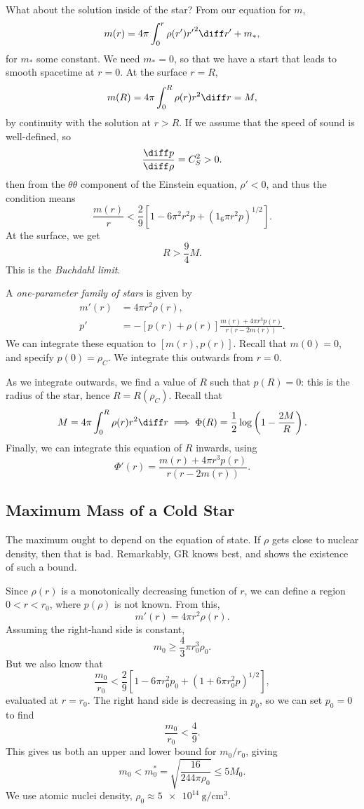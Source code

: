 \documentclass[12pt]{article}
\begin{document}
What about the solution inside of the star? From our equation for $m$,
\[
m(r) = 4 \pi \int_0^r \rho(r') {r'}^2 \diff r' + m_\ast,
\]
for $m_\ast$ some constant. We need $m_\ast = 0$, so that we have a start that leads to smooth spacetime at $r = 0$. At the surface $r = R$,
\[
m(R) = 4 \pi \int_0^R \rho(r) r^2 \diff r = M,
\]
by continuity with the solution at $r > R$. If we assume that the speed of sound is well-defined, so
\[
\frac{\diff p}{\diff \rho} = C_S^2 > 0.
\]
then from the $\theta\theta$ component of the Einstein equation, $\rho' < 0$, and thus the condition means
\[
	\frac{m(r)}{r} < \frac{2}{9} \left[ 1 - 6 \pi^2 r^2 p + (1 _ 6 \pi r^2 p)^{1/2} \right].
\]
At the surface, we get
\[
R > \frac 94 M.
\]
This is the \emph{Buchdahl limit}.

A \emph{one-parameter family of stars} is given by
\begin{align*}
	m'(r) &= 4 \pi r^2 \rho(r), \\
	p' &= - [p(r) + \rho(r)] \frac{m(r) + 4 \pi r^3 p(r)}{r(r - 2m(r))}.
\end{align*}
We can integrate these equation to $[m(r), p(r)]$. Recall that $m(0) = 0$, and specify $p(0) = \rho_C$. We integrate this outwards from $r = 0$.

As we integrate outwards, we find a value of $R$ such that $p(R) = 0$: this is the radius of the star, hence $R = R(\rho_C)$. Recall that
\[
M = 4 \pi \int_0^R \rho(r) r^2 \diff r \implies \Phi(R) = \frac 12 \log \left( 1 - \frac{2M}{R} \right).
\]
Finally, we can integrate this equation of $R$ inwards, using
\[
\Phi'(r) = \frac{m(r) + 4 \pi r^3 p(r)}{r(r - 2m(r))}.
\]

\subsection{Maximum Mass of a Cold Star}%
\label{sub:mmcs}

The maximum ought to depend on the equation of state. If $\rho$ gets close to nuclear density, then that is bad. Remarkably, GR knows best, and shows the existence of such a bound.

Since $\rho(r)$ is a monotonically decreasing function of $r$, we can define a region $0 < r < r_0$, where $p(\rho)$ is not known. From this,
\[
m'(r) = 4\pi r^2 \rho(r).
\]
Assuming the right-hand side is constant,
\[
m_0 \geq \frac 43 \pi r_0^3 \rho_0.
\]
But we also know that
\[
	\frac{m_0}{r_0} < \frac 29 \left[ 1 - 6 \pi r_0^2 p_0 + (1 + 6 \pi r_0^2 p)^{1/2} \right],
\]
evaluated at $r = r_0$. The right hand side is decreasing in $p_0$, so we can set $p_0 = 0$ to find
\[
\frac{m_0}{r_0} < \frac 49.
\]
This gives us both an upper and lower bound for $m_0/r_0$, giving
\[
	m_0 < m_0^{\ast} = \sqrt{\frac{16}{244 \pi \rho_0}} \leq 5 M_0.
\]
We use atomic nuclei density, $\rho_0 \approx \qty{5e14}{\gram\per\centi\meter\cubed}$.
\end{document}
